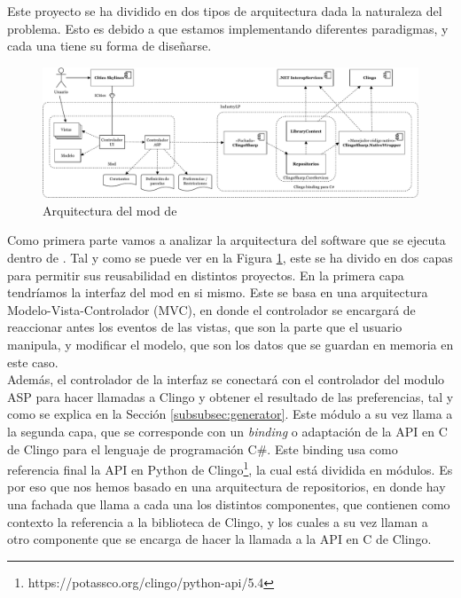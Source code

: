 Este proyecto se ha dividido en dos tipos de arquitectura dada la naturaleza del problema. Esto es debido a que estamos implementando diferentes paradigmas, y cada una tiene su forma de diseñarse. \\

\begin{figure}[!h]
	\centering
	\includegraphics[width=\textwidth]{images/arquitectura-mod}
	\caption{Arquitectura del mod de \cities}
	\label{fig:arquitectura-mod}
\end{figure}

Como primera parte vamos a analizar la arquitectura del software que se ejecuta dentro de \cities. Tal y como se puede ver en la Figura \ref{fig:arquitectura-mod}, este se ha divido en dos capas para permitir sus reusabilidad en distintos proyectos. En la primera capa tendríamos la interfaz del mod en si mismo. Este se basa en una arquitectura Modelo-Vista-Controlador (MVC), en donde el controlador se encargará de reaccionar antes los eventos de las vistas, que son la parte que el usuario manipula, y modificar el modelo, que son los datos que se guardan en memoria en este caso. \\

Además, el controlador de la interfaz se conectará con el controlador del modulo ASP para hacer llamadas a Clingo y obtener el resultado de las preferencias, tal y como se explica en la Sección \ref{subsubsec:generator}. Este módulo a su vez llama a la segunda capa, que se corresponde con un \textit{binding} o adaptación de la API en C de Clingo para el lenguaje de programación C\#. Este binding usa como referencia final la API en Python de Clingo\footnote{https://potassco.org/clingo/python-api/5.4}, la cual está dividida en módulos. Es por eso que nos hemos basado en una arquitectura de repositorios, en donde hay una fachada que llama a cada una los distintos componentes, que contienen como contexto la referencia a la biblioteca de Clingo, y los cuales a su vez llaman a otro componente que se encarga de hacer la llamada a la API en C de Clingo. \\

